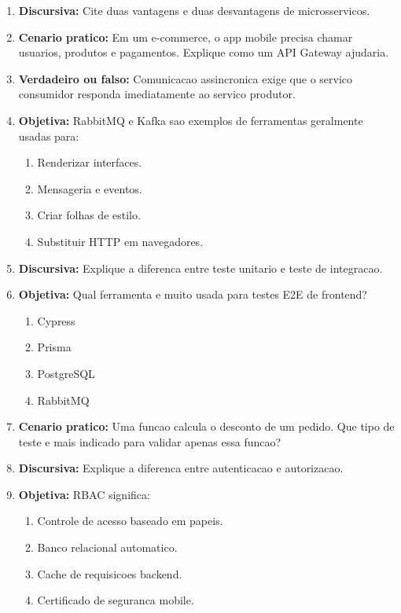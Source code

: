 \documentclass[12pt,a4paper]{article}
\begin{document}
\begin{enumerate}
  \item \textbf{Discursiva:} Cite duas vantagens e duas desvantagens de microsservicos.

  \item \textbf{Cenario pratico:} Em um e-commerce, o app mobile precisa chamar usuarios, produtos e pagamentos. Explique como um API Gateway ajudaria.

  \item \textbf{Verdadeiro ou falso:} Comunicacao assincronica exige que o servico consumidor responda imediatamente ao servico produtor.

  \item \textbf{Objetiva:} RabbitMQ e Kafka sao exemplos de ferramentas geralmente usadas para:
  \begin{enumerate}[label=\alph*)]
    \item Renderizar interfaces.
    \item Mensageria e eventos.
    \item Criar folhas de estilo.
    \item Substituir HTTP em navegadores.
  \end{enumerate}

  \item \textbf{Discursiva:} Explique a diferenca entre teste unitario e teste de integracao.

  \item \textbf{Objetiva:} Qual ferramenta e muito usada para testes E2E de frontend?
  \begin{enumerate}[label=\alph*)]
    \item Cypress
    \item Prisma
    \item PostgreSQL
    \item RabbitMQ
  \end{enumerate}

  \item \textbf{Cenario pratico:} Uma funcao calcula o desconto de um pedido. Que tipo de teste e mais indicado para validar apenas essa funcao?

  \item \textbf{Discursiva:} Explique a diferenca entre autenticacao e autorizacao.

  \item \textbf{Objetiva:} RBAC significa:
  \begin{enumerate}[label=\alph*)]
    \item Controle de acesso baseado em papeis.
    \item Banco relacional automatico.
    \item Cache de requisicoes backend.
    \item Certificado de seguranca mobile.
  \end{enumerate}


\end{enumerate}
\end{document}
